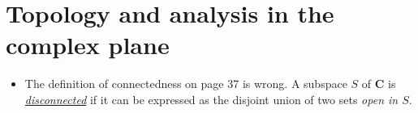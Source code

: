 \documentclass[11pt]{article}
\newcommand{\df}[1]{\ul{\textit{\textsf{#1}}}} %
\newcommand{\C}{\mathbf{C}}
\begin{document}
\section{Topology and analysis in the complex plane}
\begin{itemize}
    \item The definition of connectedness on page 37 is wrong. A subspace $S$ of $\C$ is \df{disconnected} if it can be expressed as the disjoint union of two  sets \textit{open in $S$}.
\end{itemize}
\end{document}
